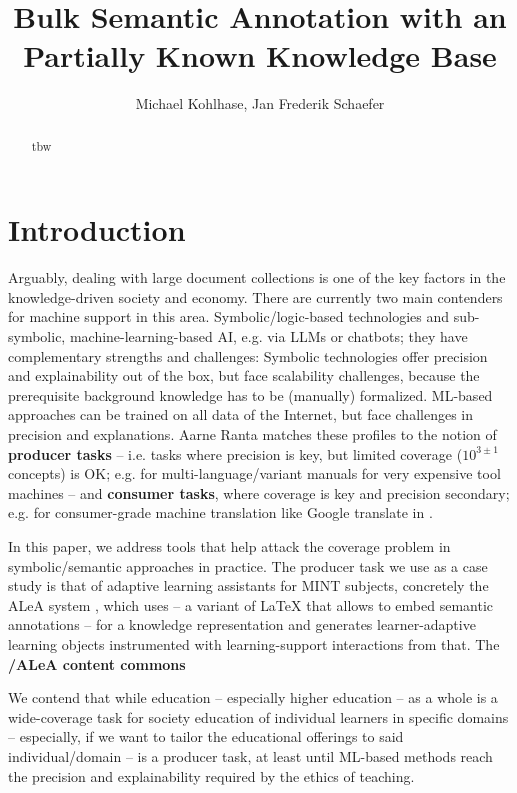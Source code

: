 \documentclass{llncs}
\title{Bulk Semantic Annotation with an Partially Known Knowledge Base}
\author{Michael Kohlhase, Jan Frederik Schaefer}
\institute{Computer Science, FAU Erlangen N\"urnberg, Germany}
\newcommand\ALeA{\textsf{ALeA}\xspace}
\begin{document}
\maketitle
\begin{abstract}
tbw
\end{abstract}

\section{Introduction}
Arguably, dealing with large document collections is one of the key factors in the
knowledge-driven society and economy. There are currently two main contenders for machine
support in this area. Symbolic/logic-based technologies and sub-symbolic,
machine-learning-based AI, e.g. via LLMs or chatbots; they have complementary strengths
and challenges: Symbolic technologies offer precision and explainability out of the box,
but face scalability challenges, because the prerequisite background knowledge has to be
(manually) formalized. ML-based approaches can be trained on all data of the Internet, but
face challenges in precision and explanations. Aarne Ranta matches these profiles to the
notion of \textbf{producer tasks} -- i.e. tasks where precision is key, but limited
coverage ($10^{3\pm1}$ concepts) is OK; e.g. for multi-language/variant manuals for very
expensive tool machines -- and \textbf{consumer tasks}, where coverage is key and
precision secondary; e.g. for consumer-grade machine translation like \textsf{Google
  translate} in \cite{Ranta:atcp17}.

In this paper, we address tools that help attack the coverage problem in symbolic/semantic
approaches in practice. The producer task we use as a case study is that of adaptive
learning assistants for MINT subjects, concretely the \ALeA system
\cite{BerBetChu:lssmkm23}, which uses \sTeX \cite{MueKo:sdstex22,sTeX:github:on} -- a
variant of {\LaTeX} that allows to embed semantic annotations -- for a knowledge
representation and generates learner-adaptive learning objects instrumented with
learning-support interactions from that. The \textbf{\sTeX/\ALeA content commons}

We contend that while education -- especially higher education -- as a whole is a
wide-coverage task for society education of individual learners in specific domains --
especially, if we want to tailor the educational offerings to said individual/domain -- is
a producer task, at least until ML-based methods reach the precision and explainability
required by the ethics of teaching.
\end{document}
